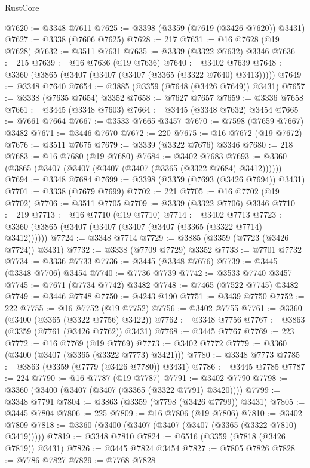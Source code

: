 \begin{lexlean}{RustCore}
\begin{coremodule}
@7620 := @3348 @7611
@7625 := @3398 (@3359 (@7619 (@3426 @7620)) @3431)
@7627 := @3338 (@7606 @7625)
@7628 := 217
@7631 := @16 @7628 (@19 @7628)
@7632 := @3511 @7631
@7635 := @3339 (@3322 @7632) @3346
@7636 := 215
@7639 := @16 @7636 (@19 @7636)
@7640 := @3402 @7639
@7648 := @3360 (@3865 (@3407 (@3407 (@3407 (@3365 (@3322 @7640) @3413)))))
@7649 := @3348 @7640
@7654 := @3885 (@3359 (@7648 (@3426 @7649)) @3431)
@7657 := @3338 (@7635 @7654) @3352
@7658 := @7627 @7657
@7659 := @3336 @7658
@7661 := @3445 (@3348 @7603)
@7664 := @3445 (@3348 @7632) @3454
@7665 := @7661 @7664
@7667 := @3533 @7665 @3457
@7670 := @7598 (@7659 @7667) @3482
@7671 := @3446 @7670
@7672 := 220
@7675 := @16 @7672 (@19 @7672)
@7676 := @3511 @7675
@7679 := @3339 (@3322 @7676) @3346
@7680 := 218
@7683 := @16 @7680 (@19 @7680)
@7684 := @3402 @7683
@7693 := @3360 (@3865 (@3407 (@3407 (@3407 (@3407 (@3365 (@3322 @7684) @3412))))))
@7694 := @3348 @7684
@7699 := @3398 (@3359 (@7693 (@3426 @7694)) @3431)
@7701 := @3338 (@7679 @7699)
@7702 := 221
@7705 := @16 @7702 (@19 @7702)
@7706 := @3511 @7705
@7709 := @3339 (@3322 @7706) @3346
@7710 := 219
@7713 := @16 @7710 (@19 @7710)
@7714 := @3402 @7713
@7723 := @3360 (@3865 (@3407 (@3407 (@3407 (@3407 (@3365 (@3322 @7714) @3412))))))
@7724 := @3348 @7714
@7729 := @3885 (@3359 (@7723 (@3426 @7724)) @3431)
@7732 := @3338 (@7709 @7729) @3352
@7733 := @7701 @7732
@7734 := @3336 @7733
@7736 := @3445 (@3348 @7676)
@7739 := @3445 (@3348 @7706) @3454
@7740 := @7736 @7739
@7742 := @3533 @7740 @3457
@7745 := @7671 (@7734 @7742) @3482
@7748 := @7465 (@7522 @7745) @3482
@7749 := @3446 @7748
@7750 := @4243 @190
@7751 := @3439 @7750
@7752 := 222
@7755 := @16 @7752 (@19 @7752)
@7756 := @3402 @7755
@7761 := @3360 (@3400 (@3365 (@3322 @7756) @3422))
@7762 := @3348 @7756
@7767 := @3863 (@3359 (@7761 (@3426 @7762)) @3431)
@7768 := @3445 @7767
@7769 := 223
@7772 := @16 @7769 (@19 @7769)
@7773 := @3402 @7772
@7779 := @3360 (@3400 (@3407 (@3365 (@3322 @7773) @3421)))
@7780 := @3348 @7773
@7785 := @3863 (@3359 (@7779 (@3426 @7780)) @3431)
@7786 := @3445 @7785
@7787 := 224
@7790 := @16 @7787 (@19 @7787)
@7791 := @3402 @7790
@7798 := @3360 (@3400 (@3407 (@3407 (@3365 (@3322 @7791) @3420))))
@7799 := @3348 @7791
@7804 := @3863 (@3359 (@7798 (@3426 @7799)) @3431)
@7805 := @3445 @7804
@7806 := 225
@7809 := @16 @7806 (@19 @7806)
@7810 := @3402 @7809
@7818 := @3360 (@3400 (@3407 (@3407 (@3407 (@3365 (@3322 @7810) @3419)))))
@7819 := @3348 @7810
@7824 := @6516 (@3359 (@7818 (@3426 @7819)) @3431)
@7826 := @3445 @7824 @3454
@7827 := @7805 @7826
@7828 := @7786 @7827
@7829 := @7768 @7828

\end{coremodule}
\end{lexlean}
